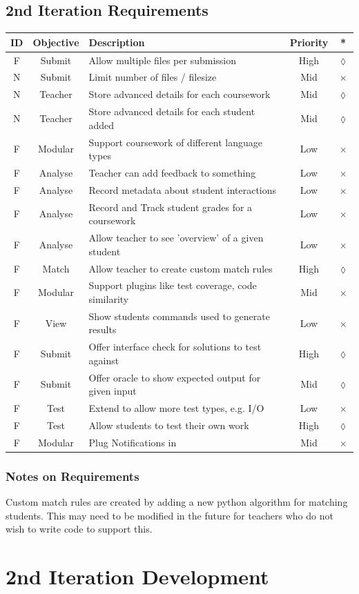 \documentclass[a4paper,11pt]{report}
\newcounter{FunCount}
\newcounter{NFunCount}
\newcommand{\freq}[4]{\addtocounter{FunCount}{1}F\arabic{FunCount} \label{itm:freq\arabic{FunCount}}& #1 & #2 & #3 & #4\\}
\newcommand{\nfreq}[4]{\addtocounter{NFunCount}{1}N\arabic{NFunCount} \label{itm:nfreq\arabic{NFunCount}}& #1 & #2 & #3 & #4\\}
\begin{document}
\subsection{2nd Iteration Requirements}
\begin{longtable}{ccl@{}cc}
\textbf{ID} & \textbf{Objective} & \textbf{Description} & \textbf{Priority} & \textbf{*}\\\hline
\freq{Submit}{Allow multiple files per submission}{High}{$\lozenge$}
\nfreq{Submit}{Limit number of files / filesize}{Mid}{$\times$}
\nfreq{Teacher}{Store advanced details for each coursework}{Mid}{$\lozenge$}
\nfreq{Teacher}{Store advanced details for each student added}{Mid}{$\lozenge$}
\freq{Modular}{Support coursework of different language types}{Low}{$\times$}
\freq{Analyse}{Teacher can add feedback to something}{Low}{$\times$}
\freq{Analyse}{Record metadata about student interactions}{Low}{$\times$}
\freq{Analyse}{Record and Track student grades for a coursework}{Low}{$\times$}
\freq{Analyse}{Allow teacher to see 'overview' of a given student}{Low}{$\times$}
\freq{Match}{Allow teacher to create custom match rules}{High}{$\lozenge$}
\freq{Modular}{Support plugins like test coverage, code similarity}{Mid}{$\times$}
\freq{View}{Show students commands used to generate results}{Low}{$\times$}
\freq{Submit}{Offer interface check for solutions to test against}{High}{$\lozenge$}
\freq{Submit}{Offer oracle to show expected output for given input}{Mid}{$\lozenge$}
\freq{Test}{Extend to allow more test types, e.g. I/O}{Low}{$\times$}
\freq{Test}{Allow students to test their own work}{High}{$\lozenge$}
\freq{Modular}{Plug Notifications in}{Mid}{$\times$}
\end{longtable}
\subsubsection{Notes on Requirements}
Custom match rules are created by adding a new python algorithm for matching students. This may need to be modified in the future for teachers who do not wish to write code to support this.

\section{2nd Iteration Development}
\end{document}
